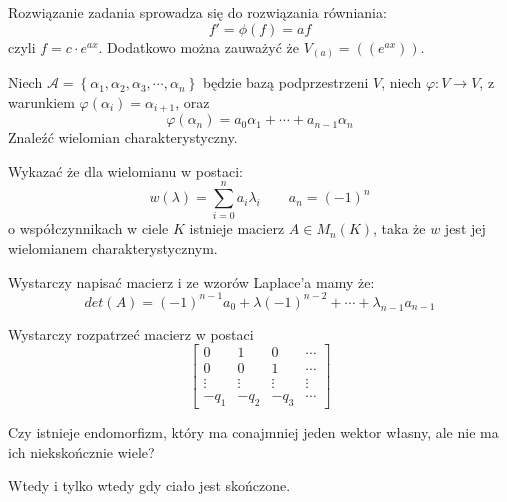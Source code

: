 \documentclass[11pt]{scrartcl}
\begin{document}
   Rozwiązanie zadania sprowadza się do rozwiązania równiania:
   \[
       f' = \phi \left ( f \right ) = af
   \]
   czyli $f = c \cdot e^{ax}$.
   Dodatkowo można zauważyć że $V_{(a)} = \left ( \left ( e^{ax} \right ) \right )$.
   
   \begin{zadanie}
     \begin{walk}
     \item Niech $\mathcal{A} = \left \{ \alpha_{1}, \alpha_{2}, \alpha_{3}, \cdots, \alpha_{n} \right \} $ będzie bazą podprzestrzeni $V$, niech $ \varphi: V \to V$, z warunkiem $\varphi \left ( \alpha_{i} \right ) = \alpha_{i+1}$, oraz
       \[
         \varphi \left ( \alpha_n \right ) = a_{0} \alpha_{1} + \cdots + a_{n-1} \alpha_{n}
       \]
       Znaleźć wielomian charakterystyczny.
      
    \item Wykazać że dla wielomianu w postaci:
      \[
        w \left ( \lambda \right ) = \sum_{i = 0}^{n} a_i \lambda_i \qquad a_n = (-1)^n
      \]
      o współczynnikach w ciele $K$ istnieje macierz $A \in M_n \left ( K \right )$, taka że $w$ jest jej wielomianem charakterystycznym.
    \end{walk}
   \end{zadanie}
   
   \begin{walk}
       \item Wystarczy napisać macierz i ze wzorów Laplace'a mamy że:
         \[
           det \left ( A \right ) = (-1)^{n-1} a_{0} + \lambda \left ( -1 \right )^{n-2} + \cdots + \lambda_{n-1} a_{n-1} 
         \]
      \item Wystarczy rozpatrzeć macierz w postaci
        \[
            \begin{bmatrix}
              0 & 1 & 0 & \cdots  \\
              0 & 0 & 1 & \cdots  \\
              \vdots & \vdots  & \vdots  & \vdots \\
              -q_{1} & -q_{2} & -q_{3} & \cdots 
            \end{bmatrix}
        \]
   \end{walk}
   
   \begin{zadanie}
       Czy istnieje endomorfizm, który ma conajmniej jeden wektor własny, ale nie ma ich niekskończnie wiele?
   \end{zadanie}
   
   Wtedy i tylko wtedy gdy ciało jest skończone.
\end{document}
